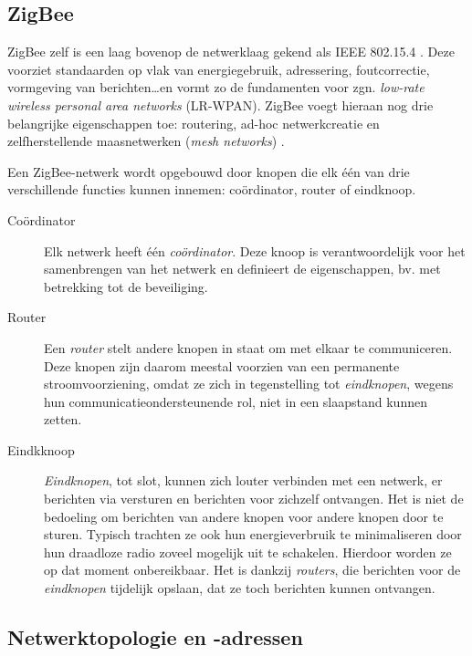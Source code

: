 \subsection{ZigBee}
\label{subsection:zigbee}

ZigBee zelf is een laag bovenop de netwerklaag gekend als IEEE 802.15.4
\citep{ieee2009802.15.4}. Deze voorziet standaarden op vlak van energiegebruik,
adressering, foutcorrectie, vormgeving van berichten\dots en vormt zo de
fundamenten voor zgn. \emph{low-rate wireless personal area networks}
(LR-WPAN). ZigBee voegt hieraan nog drie belangrijke eigenschappen toe:
routering, ad-hoc netwerkcreatie en zelfherstellende maasnetwerken (\emph{mesh
networks}) \citep{oreilly2010buildingwsn}.

Een ZigBee-netwerk wordt opgebouwd door knopen die elk \'e\'en van drie
verschillende functies kunnen innemen: co\"ordinator, router of eindknoop.

\begin{description}

  \item[Co\"ordinator] Elk netwerk heeft \'e\'en \emph{co\"ordinator}. Deze
  knoop is verantwoordelijk voor het samenbrengen van het netwerk en definieert
  de eigenschappen, bv. met betrekking tot de beveiliging.

  \item[Router] Een \emph{router} stelt andere knopen in staat om met elkaar te
  communiceren. Deze knopen zijn daarom meestal voorzien van een permanente
  stroomvoorziening, omdat ze zich in tegenstelling tot \emph{eindknopen},
  wegens hun communicatieondersteunende rol, niet in een slaapstand kunnen
  zetten.

  \item[Eindkknoop] \emph{Eindknopen}, tot slot, kunnen zich louter verbinden
  met een netwerk, er berichten via versturen en berichten voor zichzelf
  ontvangen. Het is niet de bedoeling om berichten van andere knopen voor
  andere knopen door te sturen. Typisch trachten ze ook hun energieverbruik te
  minimaliseren door hun draadloze radio zoveel mogelijk uit te schakelen.
  Hierdoor worden ze op dat moment onbereikbaar. Het is dankzij \emph{routers},
  die berichten voor de \emph{eindknopen} tijdelijk opslaan, dat ze toch
  berichten kunnen ontvangen.

\end{description}

\subsection{Netwerktopologie en -adressen}
\label{subsection:topologie}

